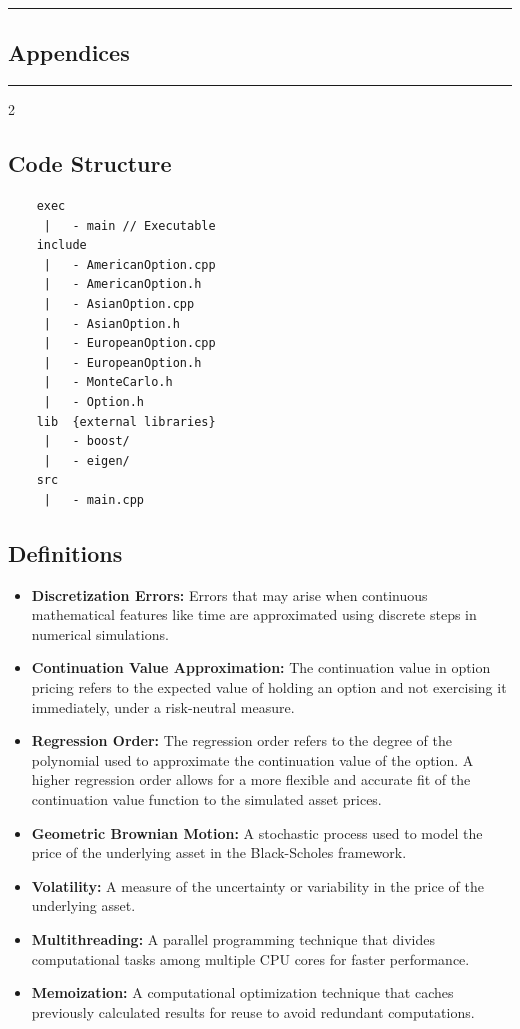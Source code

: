 {\color{gray}\hrule}
\begin{center}
\section{Appendices}
\bigskip
\end{center}
{\color{gray}\hrule}
\begin{multicols}{2}
\subsection{Code Structure}
\begin{verbatim}
    exec
     |   - main // Executable
    include
     |   - AmericanOption.cpp
     |   - AmericanOption.h
     |   - AsianOption.cpp
     |   - AsianOption.h
     |   - EuropeanOption.cpp
     |   - EuropeanOption.h
     |   - MonteCarlo.h
     |   - Option.h
    lib  {external libraries}
     |   - boost/
     |   - eigen/
    src
     |   - main.cpp
\end{verbatim}
\subsection{Definitions}
\begin{itemize}
    \item \textbf{Discretization Errors:} Errors that may arise when continuous mathematical features like time are approximated using discrete steps in numerical simulations.
    \item \textbf{Continuation Value Approximation:} The continuation value in option pricing refers to the expected value of holding an option and not exercising it immediately, under a risk-neutral measure.
    \item \textbf{Regression Order:} The regression order refers to the degree of the polynomial used to approximate the continuation value of the option. A higher regression order allows for a more flexible and accurate fit of the continuation value function to the simulated asset prices. 
    \item \textbf{Geometric Brownian Motion:} A stochastic process used to model the price of the underlying asset in the Black-Scholes framework.
    \item \textbf{Volatility:} A measure of the uncertainty or variability in the price of the underlying asset.
    \item \textbf{Multithreading:} A parallel programming technique that divides computational tasks among multiple CPU cores for faster performance.
    \item \textbf{Memoization:} A computational optimization technique that caches previously calculated results for reuse to avoid redundant computations.
\end{itemize}


\end{multicols}
